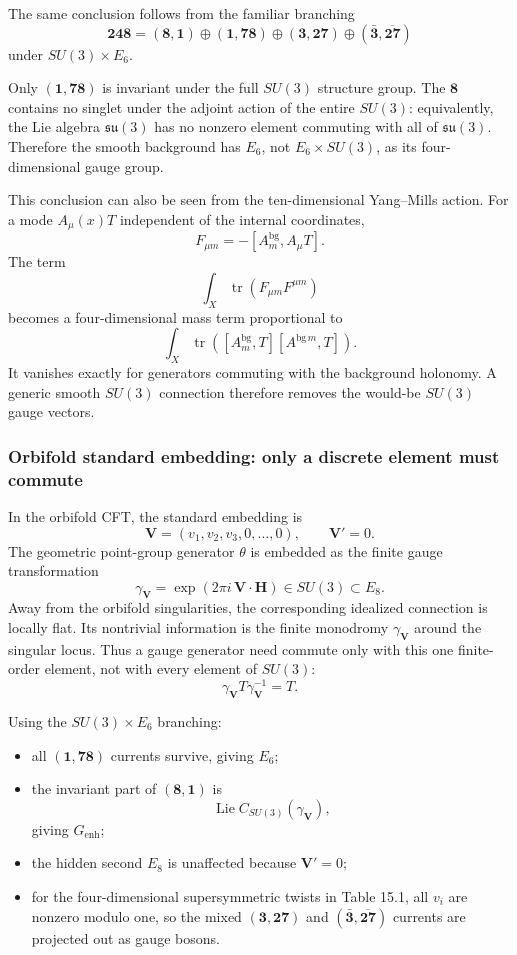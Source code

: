 \documentclass[
  10pt,
  a4paper,
  openany]{book}
\providecommand{\tightlist}{%
  \setlength{\itemsep}{0pt}\setlength{\parskip}{0pt}}
\begin{document}
The same conclusion follows from the familiar branching \[
\mathbf{248}
=
(\mathbf8,\mathbf1)
\oplus
(\mathbf1,\mathbf{78})
\oplus
(\mathbf3,\mathbf{27})
\oplus
(\bar{\mathbf3},\overline{\mathbf{27}})
\] under \(SU(3)\times E_6\).

Only \((\mathbf1,\mathbf{78})\) is invariant under the full \(SU(3)\)
structure group. The \(\mathbf8\) contains no singlet under the adjoint
action of the entire \(SU(3)\): equivalently, the Lie algebra
\(\mathfrak{su}(3)\) has no nonzero element commuting with all of
\(\mathfrak{su}(3)\). Therefore the smooth background has \(E_6\), not
\(E_6\times SU(3)\), as its four-dimensional gauge group.

This conclusion can also be seen from the ten-dimensional Yang--Mills
action. For a mode \(A_\mu(x)T\) independent of the internal
coordinates, \[
F_{\mu m}
=
-\left[A_m^{\mathrm{bg}},A_\mu T\right].
\] The term \[
\int_X
\operatorname{tr}(F_{\mu m}F^{\mu m})
\] becomes a four-dimensional mass term proportional to \[
\int_X
\operatorname{tr}
\left(
[A_m^{\mathrm{bg}},T]
[A^{\mathrm{bg}\,m},T]
\right).
\] It vanishes exactly for generators commuting with the background
holonomy. A generic smooth \(SU(3)\) connection therefore removes the
would-be \(SU(3)\) gauge vectors.

\subsubsection{Orbifold standard embedding: only a discrete element must
commute}\label{orbifold-standard-embedding-only-a-discrete-element-must-commute}

In the orbifold CFT, the standard embedding is \[
\mathbf V
=
(v_1,v_2,v_3,0,\ldots,0),
\qquad
\mathbf V'=0.
\] The geometric point-group generator \(\theta\) is embedded as the
finite gauge transformation \[
\gamma_{\mathbf V}
=
\exp(2\pi i\,\mathbf V\cdot\mathbf H)
\in SU(3)\subset E_8.
\] Away from the orbifold singularities, the corresponding idealized
connection is locally flat. Its nontrivial information is the finite
monodromy \(\gamma_{\mathbf V}\) around the singular locus. Thus a gauge
generator need commute only with this one finite-order element, not with
every element of \(SU(3)\): \[
\gamma_{\mathbf V}T\gamma_{\mathbf V}^{-1}=T.
\]

Using the \(SU(3)\times E_6\) branching:

\begin{itemize}
\tightlist
\item
  all \((\mathbf1,\mathbf{78})\) currents survive, giving \(E_6\);
\item
  the invariant part of \((\mathbf8,\mathbf1)\) is \[
  \operatorname{Lie}C_{SU(3)}(\gamma_{\mathbf V}),
  \] giving \(G_{\mathrm{enh}}\);
\item
  the hidden second \(E_8\) is unaffected because \(\mathbf V'=0\);
\item
  for the four-dimensional supersymmetric twists in Table 15.1, all
  \(v_i\) are nonzero modulo one, so the mixed
  \((\mathbf3,\mathbf{27})\) and
  \((\bar{\mathbf3},\overline{\mathbf{27}})\) currents are projected out
  as gauge bosons.
\end{itemize}
\end{document}
